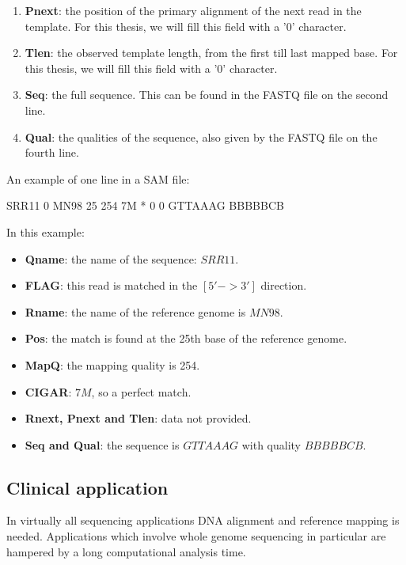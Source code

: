 \begin{enumerate}
	\item \textbf{Pnext}: the position of the primary alignment of the next read in the template. For this thesis, we will fill this field with a '0' character.
	
	\item \textbf{Tlen}: the observed template length, from the first till last mapped base. For this thesis, we will fill this field with a '0' character.
	
	\item \textbf{Seq}: the full sequence. This can be found in the FASTQ file on the second line.
	
	\item \textbf{Qual}: the qualities of the sequence, also given by the FASTQ file on the fourth line.
	
\end{enumerate}

An example of one line in a SAM file:
\begin{lcverbatim}
SRR11   0   MN98   25   254   7M   *   0   0   GTTAAAG   BBBBBCB
\end{lcverbatim}
In this example:
\begin{itemize}
	\item \textbf{Qname}: the name of the sequence: $SRR11$.
	\item \textbf{FLAG}: this read is matched in the $[5' -> 3']$ direction.
	\item \textbf{Rname}: the name of the reference genome is $MN98$.
	\item \textbf{Pos}: the match is found at the 25th base of the reference genome.
	\item \textbf{MapQ}: the mapping quality is 254.
	\item \textbf{CIGAR}: $7M$, so a perfect match.
	\item \textbf{Rnext, Pnext and Tlen}: data not provided.
	\item \textbf{Seq and Qual}: the sequence is $GTTAAAG$ with quality $BBBBBCB$.
\end{itemize}

\subsection{Clinical application}

In virtually all sequencing applications DNA alignment and reference mapping is needed. Applications which involve whole genome sequencing in particular are hampered by a long computational analysis time.

